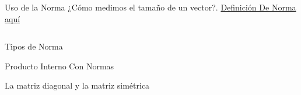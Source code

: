 \begin{frame}{Uso de la Norma}
  ¿Cómo medimos el tamaño de un vector?. \href{https://en.wikipedia.org/wiki/Norm_(mathematics)}{Definición De Norma aquí}

  \begin{columns}[t]
  
    
  \end{columns}

\end{frame}


\begin{frame}{Tipos de Norma}
    
\end{frame}

\begin{frame}{Producto Interno Con Normas}
  
\end{frame}

\begin{frame}{La matriz diagonal y la matriz simétrica}
  
\end{frame}

